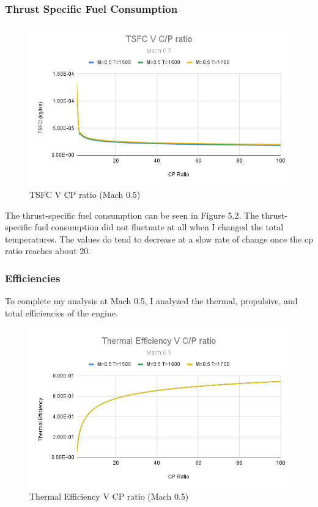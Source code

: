 \documentclass[12pt]{report}
\begin{document}
\subsubsection{Thrust Specific Fuel Consumption}

\begin{figure}[H]
    \centering
    \includegraphics[width=15.5 cm]{TSFC V C_P ratio (Mach 0.5).png}
    \caption{TSFC V CP ratio (Mach 0.5)}
    \label{fig:TSFC V C_P ratio (Mach 0.5)}
\end{figure}

The thrust-specific fuel consumption can be seen in Figure 5.2. The thrust-specific fuel consumption did not fluctuate at all when I changed the total temperatures. The values do tend to decrease at a slow rate of change once the cp ratio reaches about 20. 
\clearpage

\subsubsection{Efficiencies}

To complete my analysis at Mach 0.5, I analyzed the thermal, propulsive, and total efficiencies of the engine.  

\begin{figure}[H]
    \centering
    \includegraphics[width=15.5 cm]{Thermal Efficiency V C_P ratio (Mach 0.5).png}
    \caption{Thermal Efficiency V CP ratio (Mach 0.5)}
    \label{fig: Thermal Efficiency V CP ratio (Mach 0.5)}
\end{figure}
\end{document}

